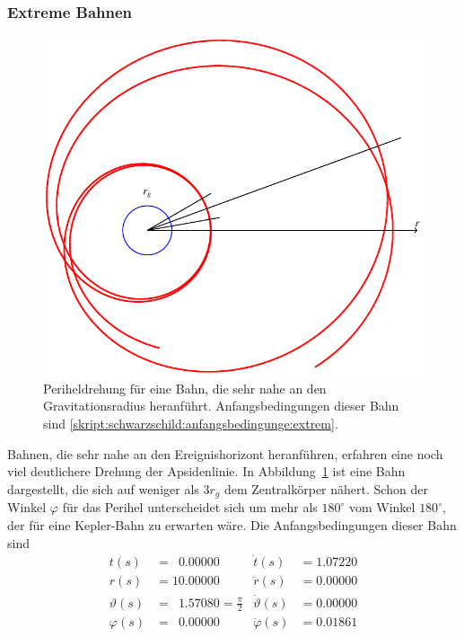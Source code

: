 \subsubsection{Extreme Bahnen}
\begin{figure}
\centering
\includegraphics{chapters/tikz/orbit2.pdf}
\caption{Periheldrehung für eine Bahn, die sehr nahe an den Gravitationsradius
heranführt.
Anfangsbedingungen dieser Bahn sind
\eqref{skript:schwarzschild:anfangsbedingunge:extrem}.
\label{skript:schwarzschild:apside:extrem}}
\end{figure}
Bahnen, die sehr nahe an den Ereignishorizont heranführen, erfahren eine
noch viel deutlichere Drehung der Apsidenlinie.
In Abbildung~\ref{skript:schwarzschild:apside:extrem}
ist eine Bahn dargestellt, die sich auf weniger als $3r_g$ dem Zentralkörper
nähert.
Schon der Winkel $\varphi$ für das Perihel unterscheidet sich um mehr
als $180^\circ$ vom Winkel $180^\circ$, der für eine Kepler-Bahn zu
erwarten wäre.
%
Die Anfangsbedingungen dieser Bahn sind
\begin{equation}
\begin{aligned}
t(s)        &=\phantom{0}0.00000                    &\dot t(s)         &= 1.07220\\
r(s)        &=          10.00000                    &\dot r(s)         &= 0.00000\\
\vartheta(s)&=\phantom{0}1.57080=\textstyle\frac\pi2&\dot \vartheta(s) &= 0.00000\\
\varphi(s)  &=\phantom{0}0.00000                    &\dot \varphi(s)   &= 0.01861
\end{aligned}
\label{skript:schwarzschild:anfangsbedingunge:extrem}
\end{equation}

